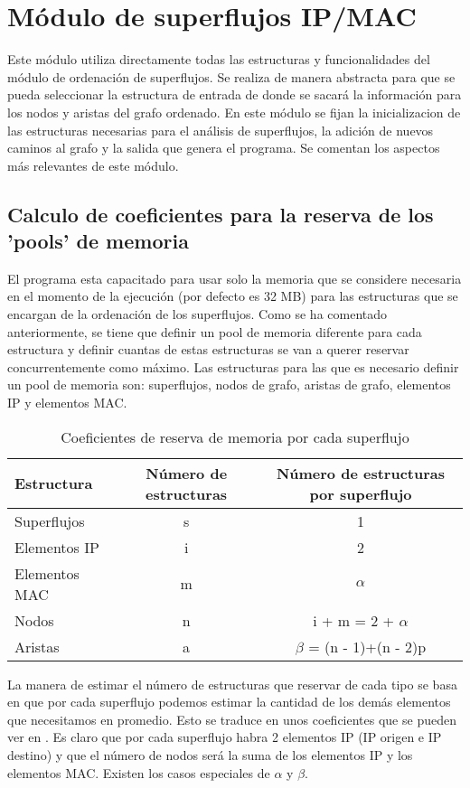\documentclass[twoside, 12pt]{epstfg}
\begin{document}
\section{Módulo de superflujos IP/MAC}
Este módulo utiliza directamente todas las estructuras y funcionalidades del módulo de ordenación de superflujos. Se realiza de manera abstracta para que se pueda seleccionar la estructura de entrada de donde se sacará la información para los nodos y aristas del grafo ordenado. En este módulo se fijan la inicializacion de las estructuras necesarias para el análisis de superflujos, la adición de nuevos caminos al grafo y la salida que genera el programa. Se comentan los aspectos más relevantes de este módulo.

\subsection{Calculo de coeficientes para la reserva de los 'pools' de memoria}
El programa esta capacitado para usar solo la memoria que se considere necesaria en el momento de la ejecución (por defecto es 32 MB) para las estructuras que se encargan de la ordenación de los superflujos. Como se ha comentado anteriormente, se tiene que definir un pool de memoria diferente para cada estructura y definir cuantas de estas estructuras se van a querer reservar concurrentemente como máximo. Las estructuras para las que es necesario definir un pool de memoria son: superflujos, nodos de grafo, aristas de grafo, elementos IP y elementos MAC. 

\begin{table}[hbtp]
	\centering
	\small
	\begin{tabular}{lcc}
		\toprule \textbf{Estructura} & \textbf{Número de estructuras}  & \textbf{Número de estructuras por superflujo} \\ \midrule
		Superflujos & s & 1 \\
		Elementos IP & i & 2 \\
		Elementos MAC & m & $\alpha$ \\
		Nodos & n & i + m = 2 + $\alpha$ \\
		Aristas & a & $\beta$ = (n - 1)+(n - 2)p \\ \bottomrule
	\end{tabular}
	\caption{Coeficientes de reserva de memoria por cada superflujo}
	\label{tab:Desarrollo:Coeficientes memoria}
\end{table}

La manera de estimar el número de estructuras que reservar de cada tipo se basa en que por cada superflujo podemos estimar la cantidad de los demás elementos que necesitamos en promedio. Esto se traduce en unos coeficientes que se pueden ver en . Es claro que por cada superflujo habra 2 elementos IP (IP origen e IP destino) y que el número de nodos será la suma de los elementos IP y los elementos MAC. Existen los casos especiales de $\alpha$ y $\beta$.
\end{document}
